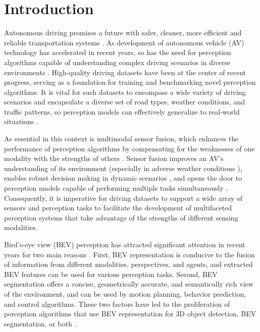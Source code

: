 \section{Introduction} \label{sec:intro}

Autonomous driving promises a future with safer, cleaner, more efficient and reliable transportation systems \cite{eskandarian2019research, wang2023multimodal}. As development of autonomous vehicle (AV) technology has accelerated in recent years, so has the need for perception algorithms capable of understanding complex driving scenarios in diverse environments \cite{zhao2023autonomous, cui2024survey}. High-quality driving datasets have been at the center of recent progress, serving as a foundation for training and benchmarking novel perception algorithms. It is vital for such datasets to encompass a wide variety of driving scenarios and encapsulate a diverse set of road types, weather conditions, and traffic patterns, so perception models can effectively generalize to real-world situations \cite{liu2024survey, song2023synthetic, guo2019safe}.

As essential in this context is multimodal sensor fusion, which enhances the performance of perception algorithms by compensating for the weaknesses of one modality with the strengths of others \cite{zhuang2021perception, chitta2022transfuser, xu2018pointfusion}. Sensor fusion improves an AV's understanding of its environment \cite{wang2023multisensor} (especially in adverse weather conditions \cite{bijelic2020seeing}), enables robust decision making in dynamic scenarios \cite{huang2020multi, shao2023safety}, and opens the door to perception models capable of performing multiple tasks simultaneously \cite{liu2022bevfusion, natan2022towards, phillips2021deep, huang2023fuller}. Consequently, it is imperative for driving datasets to support a wide array of sensors and perception tasks to facilitate the development of multifaceted perception systems that take advantage of the strengths of different sensing modalities.

Bird's-eye view (BEV) perception has attracted significant attention in recent years for two main reasons \cite{ma2024vision}. First, BEV representation is conducive to the fusion of information from different modalities, perspectives, and agents, and extracted BEV features can be used for various perception tasks. Second, BEV segmentation offers a concise, geometrically accurate, and semantically rich view of the environment, and can be used by motion planning, behavior prediction, and control algorithms. These two factors have led to the proliferation of perception algorithms that use BEV representation for 3D object detection, BEV segmentation, or both \cite{liu2022bevfusion, huang2023fuller, wang2023bi, xiong2023lxl, lin2024rcbevdet, jiao2023msmdfusion, li2022time3d, li2024unimode, zhang2023uni3d, xiong2023cape, man2023bev, wang2023unitr, yang2023bevformer, cai2023bevfusion4d, liu2023petrv2, mohapatra2021bevdetnet, gunn2024lift, liu2024seed, huang2021bevdet, wang2022detr3d, liang2022bevfusion, luo2022detr4d, li2024bevnext, zhao2024maskbev, dutta2022vit, gong2022gitnet, peng2023bevsegformer, xie2022m, xu2023cobevt, li2024fast, zhao2024improving}.


